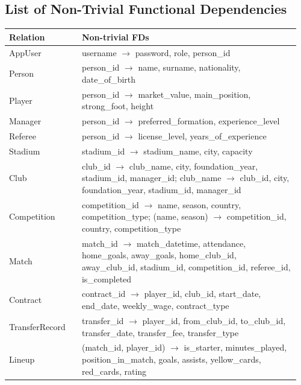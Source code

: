 \documentclass[12pt]{article}
\begin{document}
\subsection{List of Non-Trivial Functional Dependencies}
\begin{longtable}{@{}p{0.24\linewidth}p{0.72\linewidth}@{}}
\toprule
\textbf{Relation} & \textbf{Non-trivial FDs} \\
\midrule
\endhead

AppUser & username $\rightarrow$ password, role, person\_id \\

Person & person\_id $\rightarrow$ name, surname, nationality, date\_of\_birth \\

Player & person\_id $\rightarrow$ market\_value, main\_position, strong\_foot, height \\

Manager & person\_id $\rightarrow$ preferred\_formation, experience\_level \\

Referee & person\_id $\rightarrow$ license\_level, years\_of\_experience \\

Stadium & stadium\_id $\rightarrow$ stadium\_name, city, capacity \\

Club & club\_id $\rightarrow$ club\_name, city, foundation\_year, stadium\_id, manager\_id; \;
club\_name $\rightarrow$ club\_id, city, foundation\_year, stadium\_id, manager\_id \\

Competition & competition\_id $\rightarrow$ name, season, country, competition\_type; \;
(name, season) $\rightarrow$ competition\_id, country, competition\_type \\

Match & match\_id $\rightarrow$ match\_datetime, attendance, home\_goals, away\_goals, home\_club\_id, away\_club\_id, stadium\_id, competition\_id, referee\_id, is\_completed \\

Contract & contract\_id $\rightarrow$ player\_id, club\_id, start\_date, end\_date, weekly\_wage, contract\_type \\

TransferRecord & transfer\_id $\rightarrow$ player\_id, from\_club\_id, to\_club\_id, transfer\_date, transfer\_fee, transfer\_type \\

Lineup & (match\_id, player\_id) $\rightarrow$ is\_starter, minutes\_played, position\_in\_match, goals, assists, yellow\_cards, red\_cards, rating \\

\bottomrule
\end{longtable}
\end{document}

